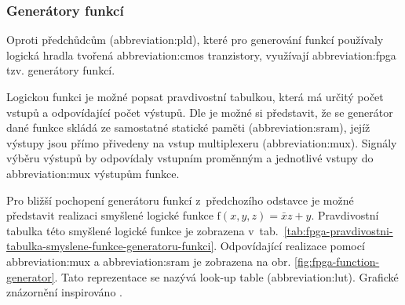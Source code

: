 \documentclass[a4paper, twoside, 11pt]{article}
\begin{document}
		\subsubsection{Generátory funkcí}\label{subsubsec:generatory-funkci}
		Oproti předchůdcům (\gls{abbreviation:pld}), které pro generování funkcí používaly logická hradla tvořená \gls{abbreviation:cmos} tranzistory, využívají \gls{abbreviation:fpga} tzv. generátory funkcí.\par
		Logickou funkci je možné popsat pravdivostní tabulkou, která má určitý počet vstupů a odpovídající počet výstupů. Dle \cite{Sass2010} je možné si představit, že se generátor dané funkce skládá ze samostatné statické paměti (\gls{abbreviation:sram}), jejíž výstupy jsou přímo přivedeny na vstup multiplexeru (\gls{abbreviation:mux}). Signály výběru výstupů by odpovídaly vstupním proměnným a jednotlivé vstupy do \gls{abbreviation:mux} výstupům funkce.\par
		Pro bližší pochopení generátoru funkcí z~předchozího odstavce je možné představit realizaci smyšlené logické funkce $\text{f} (x, y, z) = \bar{x}z + y$. Pravdivostní tabulka této smyšlené logické funkce je zobrazena v~tab.~\ref{tab:fpga-pravdivostni-tabulka-smyslene-funkce-generatoru-funkci}. Odpovídající realizace pomocí \gls{abbreviation:mux} a \gls{abbreviation:sram} je zobrazena na obr. \ref{fig:fpga-function-generator}. Tato reprezentace se nazývá look-up table (\gls{abbreviation:lut}). Grafické znázornění inspirováno \cite{Sass2010}.
		
\end{document}
